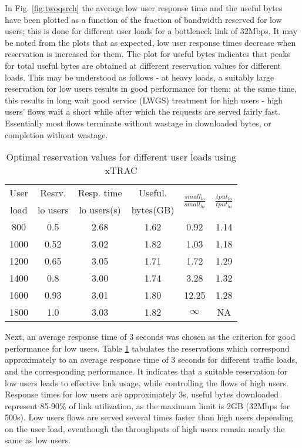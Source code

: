 \documentclass[conference]{../../IEEEtran}
\begin{document}
In Fig. \ref{fig:twoqsrch} the average low user response time and the useful bytes have been plotted as a function of the fraction of bandwidth reserved for low users; this is done for different user loads for a bottleneck link of 32Mbps. It may be noted from the plots that as expected, low user response times decrease when reservation is increased for them. The plot for useful bytes indicates that peaks for total useful bytes are obtained at different reservation values for different loads. This may be understood as follows - at heavy loads, a suitably large reservation for low users results in good performance for them; at the same time, this results in long wait good service (LWGS) treatment for high users - high users' flows wait a short while after which the requests are served fairly fast. Essentially most flows terminate without wastage in downloaded bytes, or completion without wastage. 


\begin{table}[hbt]
 \caption{Optimal reservation values for different user loads using xTRAC}
 \label{tab:rsrvrespdwnld}
 \centering
 \begin{tabular}{|c|c|c|c|c|c|}
 \hline
  User  & Resrv. &  Resp. time & Useful. & \multirow{2}{*}{\boldmath$\frac{small_{lo}}{small_{hi}}$}& \multirow{2}{*}{\boldmath$\frac{tput_{lo}}{tput_{hi}}$}\\
  load & lo users & lo users(s) & bytes(GB) &&\\
 \hline
 800&0.5&2.68&1.62&0.92&1.14\\
 \hline
 1000&0.52&3.02&1.82&1.03&1.18\\
 \hline
 1200&0.65&3.05&1.71&1.72&1.29\\
 \hline
 1400&0.8&3.00&1.74&3.28&1.32\\
 \hline
 1600&0.93&3.01&1.80&12.25&1.28\\
 \hline
 1800&1.0&3.03&1.82&$\infty$&NA\\
 \hline
 \end{tabular}
\end{table}

Next, an average response time of 3 seconds was chosen as the criterion for good performance for low users. Table \ref{tab:rsrvrespdwnld} tabulates the reservations which correspond approximately to an average response time of 3 seconds for different traffic loads, and the corresponding performance.
It indicates that a suitable reservation for low users leads to effective link usage, while controlling the flows of high users. Response times for low users are approximately 3s, useful bytes downloaded represent 85-90\% of link utilization, as the maximum limit is 2GB (32Mbps for 500s). Low users flows are served several times faster than high users depending on the user load, eventhough the throughputs of high users remain nearly the same as low users.
\end{document}
